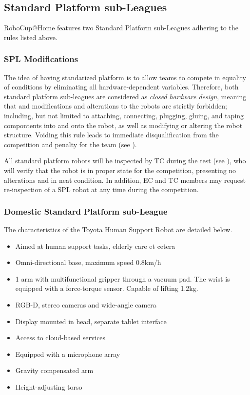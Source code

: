 \subsection{Standard Platform sub-Leagues}
RoboCup@Home features two Standard Platform sub-Leagues adhering to the rules listed above.

\subsubsection{SPL Modifications}
\label{rule:spl-mods}
The idea of having standarized platform is to allow teams to compete in equality of conditions by eliminating all hardware-dependent variables. Therefore, both standard platform sub-leagues are considered as \emph{closed hardware design}, meaning that and modifications and alterations to the robots are strictly forbidden; including, but not limited to attaching, connecting, plugging, gluing, and taping compontents into and onto the robot, as well as modifying or altering the robot structure. Voiding this rule leads to immediate disqualification from the competition and penalty for the team (see ).

All standard platform robots will be inspected by TC during the  test (see ), who will verify that the robot is in proper state for the competition, presenting no alterations and in neat condition. In addition, EC and TC members may request re-inspection of a SPL robot at any time during the competition.

\subsubsection{Domestic Standard Platform sub-League}
The characteristics of the Toyota Human Support Robot are detailed below. 

\begin{itemize}
    \item Aimed at human support tasks, elderly care et cetera
    \item Omni-directional base, maximum speed 0.8km/h
    \item 1 arm with multifunctional gripper through a vacuum pad. The wrist is equipped with a force-torque sensor. Capable of lifting 1.2kg. 
    \item RGB-D, stereo cameras and wide-angle camera
    \item Display mounted in head, separate tablet interface
    \item Access to cloud-based services
    \item Equipped with a microphone array
    \item Gravity compensated arm
    \item Height-adjusting torso
\end{itemize}

